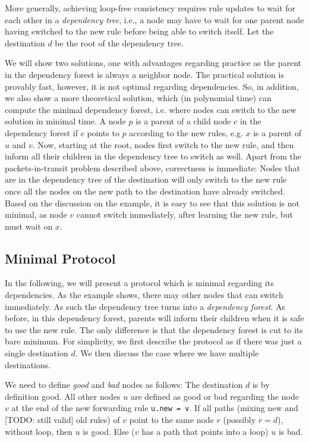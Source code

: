 More generally, achieving loop-free consistency requires rule updates to wait for each other in a \emph{dependency tree}, i.e., a node may have to wait for one parent node having switched to the new rule before being able to switch itself. Let the destination $d$ be the root of the dependency tree.

We will show two solutions, one with advantages regarding practice as the parent in the dependency forest is always a neighbor node. The practical solution is provably fast, however, it is not optimal regarding dependencies. So, in addition, we also show a more theoretical solution, which (in polynomial time) can compute the minimal dependency forest, i.e. where nodes can switch to the new solution in minimal time.
A node $p$ is a parent of a child node $c$ in the dependency forest if $c$ points to $p$ according to the new rules, e.g. $x$ is a parent of $u$ and $v$. Now, starting at the root, nodes first switch to the new rule, and then inform all their children in the dependency tree to switch as well. Apart from the packets-in-transit problem described above, correctness is immediate: Nodes that are in the dependency tree of the destination will only switch to the new rule once all the nodes on the new path to the destination have already switched. Based on the discussion on the example, it is easy to see that this solution is not minimal, as node $v$ cannot switch immediately, after learning the new rule, but must wait on $x$.


\subsection{Minimal Protocol}

In the following, we will present a protocol which is minimal regarding its dependencies. As the example shows, there may other nodes that can switch immediately. As such the dependency tree turns into a \emph{dependency forest}. As before, in this dependency forest, parents will inform their children when it is safe to use the new rule. The only difference is that the dependency forest is cut to its bare minimum. For simplicity, we first describe the protocol as if there was just a single destination $d$. We then discuss the case where we have multiple destinations.

We need to define \emph{good} and \emph{bad} nodes as follows: The destination $d$ is by definition good. All other nodes $u$ are defined as good or bad regarding the node $v$ at the end of the new forwarding rule \texttt{u.new = v}. If all paths (mixing new and [TODO: still valid] old rules) of $v$ point to the same node $r$ (possibly $r = d$), without loop, then $u$ is good. Else ($v$ has a path that points into a loop) $u$ is bad.

